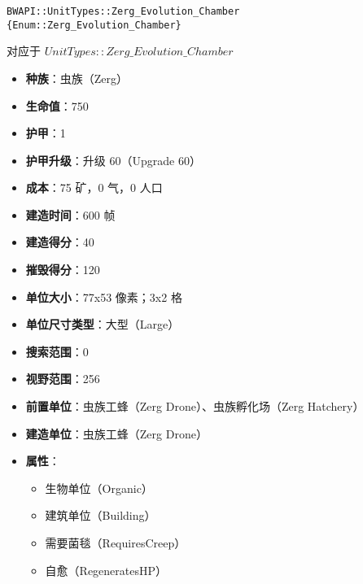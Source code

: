 \begin{tcolorbox}[colback=white, colframe=black!60!white, title=Zerg\_Evolution\_Chamber(), arc=0mm]
    \begin{verbatim}
BWAPI::UnitTypes::Zerg_Evolution_Chamber {Enum::Zerg_Evolution_Chamber}
    \end{verbatim}
    对应于  $UnitTypes::Zerg\_Evolution\_Chamber$ 
    \begin{itemize}
        \item \textbf{种族}：虫族（Zerg）
        \item \textbf{生命值}：750
        \item \textbf{护甲}：1
        \item \textbf{护甲升级}：升级 60（Upgrade 60）
        \item \textbf{成本}：75 矿，0 气，0 人口
        \item \textbf{建造时间}：600 帧
        \item \textbf{建造得分}：40
        \item \textbf{摧毁得分}：120
        \item \textbf{单位大小}：77x53 像素；3x2 格
        \item \textbf{单位尺寸类型}：大型（Large）
        \item \textbf{搜索范围}：0
        \item \textbf{视野范围}：256
        \item \textbf{前置单位}：虫族工蜂（Zerg Drone）、虫族孵化场（Zerg Hatchery）
        \item \textbf{建造单位}：虫族工蜂（Zerg Drone）
        \item \textbf{属性}：
            \begin{itemize}
                \item 生物单位（Organic）
                \item 建筑单位（Building）
                \item 需要菌毯（RequiresCreep）
                \item 自愈（RegeneratesHP）
            \end{itemize}
    \end{itemize}
\end{tcolorbox}

